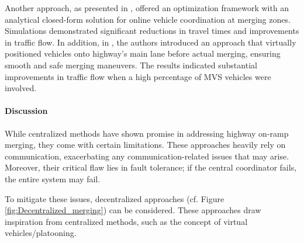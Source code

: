 Another approach, as presented in \cite{7562449}, offered an optimization framework with an analytical closed-form solution for online vehicle coordination at merging zones. Simulations demonstrated significant reductions in travel times and improvements in traffic flow. In addition, in \cite{chou2016coordinated}, the authors introduced an approach that virtually positioned vehicles onto highway's main lane before actual merging, ensuring smooth and safe merging maneuvers. The results indicated substantial improvements in traffic flow when a high percentage of MVS vehicles were involved. 

\paragraph*{Discussion}
While centralized methods have shown promise in addressing highway on-ramp merging, they come with certain limitations. These approaches heavily rely on communication, exacerbating any communication-related issues that may arise. Moreover, their critical flaw lies in fault tolerance; if the central coordinator fails, the entire system may fail. 

To mitigate these issues, decentralized approaches (cf. Figure \ref{fig:Decentralized_merging}) can be considered. These approaches draw inspiration from centralized methods, such as the concept of virtual vehicles/platooning. 

